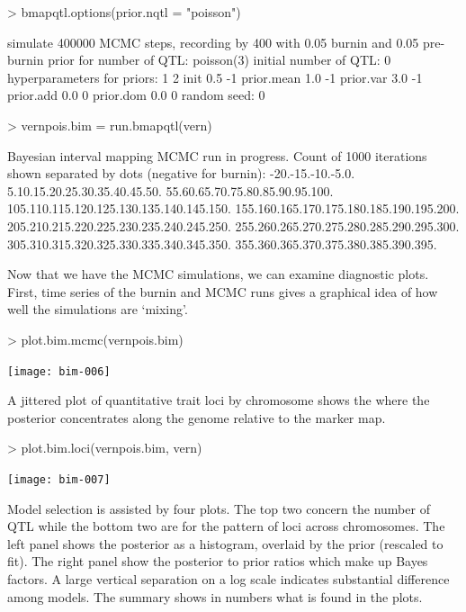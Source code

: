 \documentclass{article}
\begin{document}
\begin{Schunk}
\begin{Sinput}
> bmapqtl.options(prior.nqtl = "poisson")
\end{Sinput}
\begin{Soutput}
simulate 400000 MCMC steps, recording by 400 with 0.05 burnin and 0.05 pre-burnin
prior for number of QTL: poisson(3)
initial number of QTL: 0 
hyperparameters for priors:
             1  2
init       0.5 -1
prior.mean 1.0 -1
prior.var  3.0 -1
prior.add  0.0  0
prior.dom  0.0  0
random seed: 0 
\end{Soutput}
\end{Schunk}

\begin{Schunk}
\begin{Sinput}
> vernpois.bim = run.bmapqtl(vern)
\end{Sinput}
\begin{Soutput}
Bayesian interval mapping MCMC run in progress. 
Count of 1000 iterations shown separated by dots (negative for burnin):
-20.-15.-10.-5.0.
5.10.15.20.25.30.35.40.45.50.
55.60.65.70.75.80.85.90.95.100.
105.110.115.120.125.130.135.140.145.150.
155.160.165.170.175.180.185.190.195.200.
205.210.215.220.225.230.235.240.245.250.
255.260.265.270.275.280.285.290.295.300.
305.310.315.320.325.330.335.340.345.350.
355.360.365.370.375.380.385.390.395.
\end{Soutput}
\end{Schunk}

Now that we have the MCMC simulations, we can examine diagnostic
plots. First, time series of the burnin and MCMC runs gives a
graphical idea of how well the simulations are `mixing'.
 
\begin{Schunk}
\begin{Sinput}
> plot.bim.mcmc(vernpois.bim)
\end{Sinput}
\end{Schunk}
\texttt{[image: bim-006]}

A jittered plot of quantitative trait loci by chromosome shows the
where the posterior concentrates along the genome relative to the
marker map.

\begin{Schunk}
\begin{Sinput}
> plot.bim.loci(vernpois.bim, vern)
\end{Sinput}
\end{Schunk}
\texttt{[image: bim-007]}

Model selection is assisted by four plots. The top two concern the
number of QTL while the bottom two are for the pattern of loci across
chromosomes. The left panel shows the posterior as a histogram,
overlaid by the prior (rescaled to fit). The right panel show the
posterior to prior ratios which make up Bayes factors. A large
vertical separation on a log scale indicates substantial difference
among models. The summary shows in numbers what is found in the plots.
\end{document}
